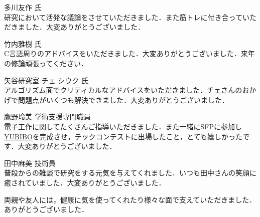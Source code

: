 多川友作 氏\\
研究において活発な議論をさせていただきました．また筋トレに付き合っていただきました．大変ありがとうございました．

竹内雅樹 氏\\
C言語周りのアドバイスをいただきました．大変ありがとうございました．来年の修論頑張ってください．

矢谷研究室 チェ シウク 氏\\
アルゴリズム面でクリティカルなアドバイスをいただきました．チェさんのおかげで問題点がいくつも解決できました．大変ありがとうございました．

鷹野玲美 学術支援専門職員\\
電子工作に関してたくさんご指導いただきました．また一緒にSFPに参加し\href{https://qiita.com/yumion/items/b7fa89f29504cab1f123}{YUBIBO}を完成させ，テックコンテストに出場したこと，とても嬉しかったです．大変ありがとうございました．

田中麻美 技術員\\
普段からの雑談で研究をする元気を与えてくれました．いつも田中さんの笑顔に癒されていました．大変ありがとうございました．

\vspace{12pt}
両親や友人には，健康に気を使ってくれたり様々な面で支えていただきました．ありがとうございました．
